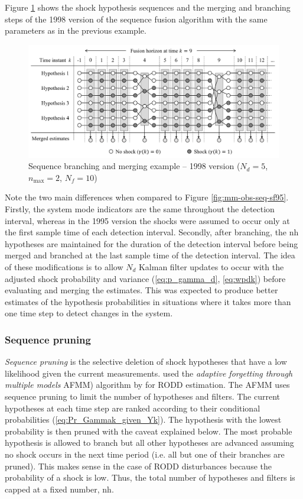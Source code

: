 Figure \ref{fig:mm-obs-seq-sf98} shows the shock hypothesis sequences and the merging and branching steps of the 1998 version of the sequence fusion algorithm with the same parameters as in the previous example.
\begin{figure}[ht]
	\centering
	\includegraphics[width=15cm]{images/mm_obs_seq_sf98.pdf}
	\caption{Sequence branching and merging example – 1998 version ($N_d=5$, $n_\text{max}=2$, $N_f=10$)}
	\label{fig:mm-obs-seq-sf98}
\end{figure}
Note the two main differences when compared to Figure \ref{fig:mm-obs-seq-sf95}. Firstly, the system mode indicators are the same throughout the detection interval, whereas in the 1995 version the shocks were assumed to occur only at the first sample time of each detection interval. Secondly, after branching, the \gls{nh} hypotheses are maintained for the duration of the detection interval before being merged and branched at the last sample time of the detection interval. The idea of these modifications is to allow $N_d$ Kalman filter updates to occur with the adjusted shock probability and variance (\ref{eq:p_gamma_d}, \ref{eq:wpdk}) before evaluating and merging the estimates. This was expected to produce better estimates of the hypothesis probabilities in situations where it takes more than one time step to detect changes in the system.

\subsubsection{Sequence pruning} \label{sec:pruning}

\textit{Sequence pruning} is the selective deletion of shock hypotheses that have a low likelihood given the current measurements. \cite{eriksson_classification_1996} used the \textit{adaptive forgetting through multiple models} \gls{AFMM}) algorithm by \cite{andersson_adaptive_1985} for \gls{RODD} estimation. The \gls{AFMM} uses sequence pruning to limit the number of hypotheses and filters. The current hypotheses at each time step are ranked according to their conditional probabilities (\ref{eq:Pr_Gammak_given_Yk}). The hypothesis with the lowest probability is then pruned with the caveat explained below. The most probable hypothesis is allowed to branch but all other hypotheses are advanced assuming no shock occurs in the next time period (i.e. all but one of their branches are pruned). This makes sense in the case of \gls{RODD} disturbances because the probability of a shock is low. Thus, the total number of hypotheses and filters is capped at a fixed number, \gls{nh}.

